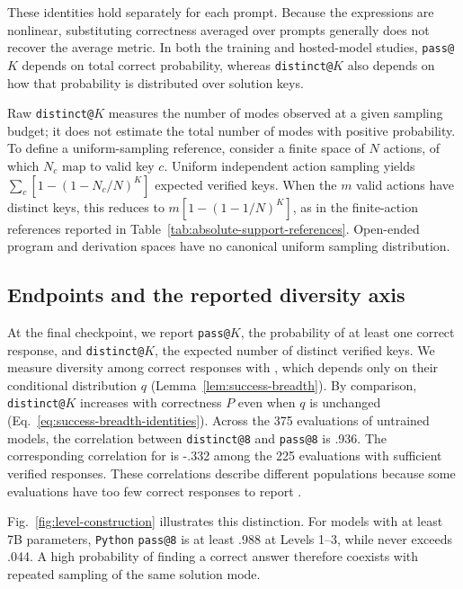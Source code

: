 These identities hold separately for each prompt. Because the expressions
are nonlinear, substituting correctness averaged over prompts generally does
not recover the average metric. In both the training and hosted-model studies,
\texttt{pass@}$K$ depends on total correct probability, whereas
\texttt{distinct@}$K$ also depends on how that probability is distributed
over solution keys.

Raw \texttt{distinct@}$K$ measures the number of modes observed at a given
sampling budget; it does not estimate the total number of modes with positive
probability. To define a uniform-sampling reference, consider a finite space
of $N$ actions, of which $N_c$ map to valid key $c$. Uniform independent
action sampling yields $\sum_c[1-(1-N_c/N)^K]$ expected verified keys.
When the $m$ valid actions have distinct keys, this reduces to
$m[1-(1-1/N)^K]$, as in the finite-action references reported in
Table~\ref{tab:absolute-support-references}. Open-ended program and
derivation spaces have no canonical uniform sampling distribution.

\subsection{Endpoints and the reported diversity axis}
\label{app:reported-endpoints}

At the final checkpoint, we report \texttt{pass@}$K$, the probability of at
least one correct response, and \texttt{distinct@}$K$, the expected number of
distinct verified keys. We measure diversity among correct responses with
\pmd{}, which depends only on their conditional distribution $q$
(Lemma~\ref{lem:success-breadth}). By comparison, \texttt{distinct@}$K$
increases with correctness $P$ even when $q$ is unchanged
(Eq.~\eqref{eq:success-breadth-identities}). Across the 375
evaluations of untrained models, the correlation between \texttt{distinct@8}
and \texttt{pass@8} is .936. The corresponding correlation for
\pmd{} is -.332 among the 225 evaluations with sufficient
verified responses. These correlations describe different populations because
some evaluations have too few correct responses to report \pmd{}.

Fig.~\ref{fig:level-construction} illustrates this distinction. For models
with at least 7B parameters, \texttt{Python} \texttt{pass@8} is at least
.988 at Levels 1--3, while \pmd{} never exceeds .044.
A high probability of finding a correct answer therefore coexists with
repeated sampling of the same solution mode.

